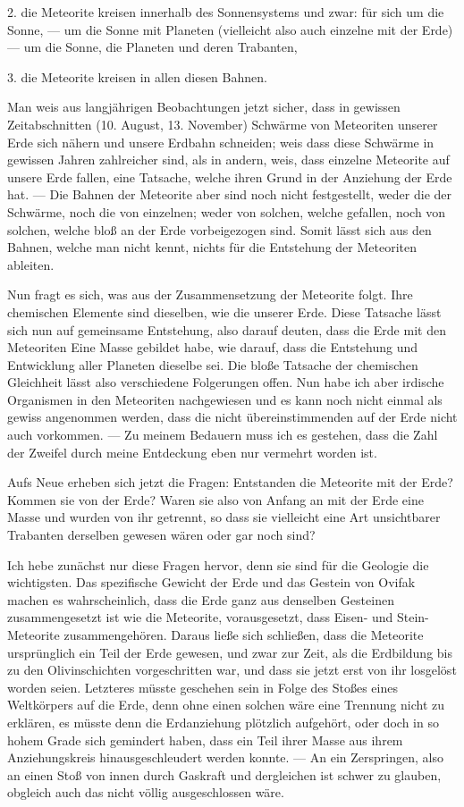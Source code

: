\documentclass[a4paper, 12pt, oneside]{article}
\begin{document}
2. die Meteorite kreisen innerhalb des Sonnensystems und zwar: für sich um die Sonne, — um die Sonne mit Planeten (vielleicht also auch einzelne mit der Erde) — um die Sonne, die Planeten und deren Trabanten,

3. die Meteorite kreisen in allen diesen Bahnen.

Man weis aus langjährigen Beobachtungen jetzt sicher, dass in gewissen Zeitabschnitten (10. August, 13. November) Schwärme von Meteoriten unserer Erde sich nähern und unsere Erdbahn schneiden; weis dass diese Schwärme in gewissen Jahren zahlreicher sind, als in andern, weis, dass einzelne Meteorite auf unsere Erde fallen, eine Tatsache, welche ihren Grund in der Anziehung der Erde hat. — Die Bahnen der Meteorite aber sind noch nicht festgestellt, weder die der Schwärme, noch die von einzelnen; weder von solchen, welche gefallen, noch von solchen, welche bloß an der Erde vorbeigezogen sind. Somit lässt sich aus den Bahnen, welche man nicht kennt, nichts für die Entstehung der Meteoriten ableiten.

Nun fragt es sich, was aus der Zusammensetzung der Meteorite folgt. Ihre chemischen Elemente sind dieselben, wie die unserer Erde. Diese Tatsache lässt sich nun auf gemeinsame Entstehung, also darauf deuten, dass die Erde mit den Meteoriten Eine Masse gebildet habe, wie darauf, dass die Entstehung und Entwicklung aller Planeten dieselbe sei. Die bloße Tatsache der chemischen Gleichheit lässt also verschiedene Folgerungen offen. Nun habe ich aber irdische Organismen in den Meteoriten nachgewiesen und es kann noch nicht einmal als gewiss angenommen werden, dass die nicht übereinstimmenden auf der Erde nicht auch vorkommen. — Zu meinem Bedauern muss ich es gestehen, dass die Zahl der Zweifel durch meine Entdeckung eben nur vermehrt worden ist.

Aufs Neue erheben sich jetzt die Fragen: Entstanden die Meteorite mit der Erde? Kommen sie von der Erde? Waren sie also von Anfang an mit der Erde eine Masse und wurden von ihr getrennt, so dass sie vielleicht eine Art unsichtbarer Trabanten derselben gewesen wären oder gar noch sind?

Ich hebe zunächst nur diese Fragen hervor, denn sie sind für die Geologie die wichtigsten. Das spezifische Gewicht der Erde und das Gestein von Ovifak machen es wahrscheinlich, dass die Erde ganz aus denselben Gesteinen zusammengesetzt ist wie die Meteorite, vorausgesetzt, dass Eisen- und Stein-Meteorite zusammengehören. Daraus ließe sich schließen, dass die Meteorite ursprünglich ein Teil der Erde gewesen, und zwar zur Zeit, als die Erdbildung bis zu den Olivinschichten vorgeschritten war, und dass sie jetzt erst von ihr losgelöst worden seien. Letzteres müsste geschehen sein in Folge des Stoßes eines Weltkörpers auf die Erde, denn ohne einen solchen wäre eine Trennung nicht zu erklären, es müsste denn die Erdanziehung plötzlich aufgehört, oder doch in so hohem Grade sich gemindert haben, dass ein Teil ihrer Masse aus ihrem Anziehungskreis hinausgeschleudert werden konnte. — An ein Zerspringen, also an einen Stoß von innen durch Gaskraft und dergleichen ist schwer zu glauben, obgleich auch das nicht völlig ausgeschlossen wäre.
\end{document}
